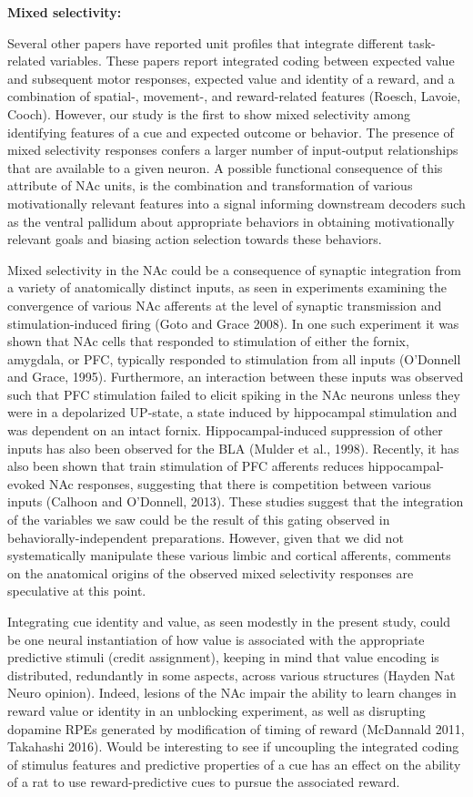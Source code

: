 \documentclass[11pt]{article}
\begin{document}
{\bf Mixed selectivity:}

Several other papers have reported unit profiles that integrate different task-related variables. These papers report integrated coding between expected value and subsequent motor responses, expected value and identity of a reward, and a combination of spatial-, movement-, and reward-related features (Roesch, Lavoie, Cooch). However, our study is the first to show mixed selectivity among identifying features of a cue and expected outcome or behavior. The presence of mixed selectivity responses confers a larger number of input-output relationships that are available to a given neuron. A possible functional consequence of this attribute of NAc units, is the combination and transformation of various motivationally relevant features into a signal informing downstream decoders such as the ventral pallidum about appropriate behaviors in obtaining motivationally relevant goals and biasing action selection towards these behaviors.

Mixed selectivity in the NAc could be a consequence of synaptic integration from a variety of anatomically distinct inputs, as seen in experiments examining the convergence of various NAc afferents at the level of synaptic transmission and stimulation-induced firing (Goto and Grace 2008). In one such experiment it was shown that NAc cells that responded to stimulation of either the fornix, amygdala, or PFC, typically responded to stimulation from all inputs (O’Donnell and Grace, 1995). Furthermore, an interaction between these inputs was observed such that PFC stimulation failed to elicit spiking in the NAc neurons unless they were in a depolarized UP-state, a state induced by hippocampal stimulation and was dependent on an intact fornix. Hippocampal-induced suppression of other inputs has also been observed for the BLA (Mulder et al., 1998). Recently, it has also been shown that train stimulation of PFC afferents reduces hippocampal-evoked NAc responses, suggesting that there is competition between various inputs (Calhoon and O’Donnell, 2013). These studies suggest that the integration of the variables we saw could be the result of this gating observed in behaviorally-independent preparations. However, given that we did not systematically manipulate these various limbic and cortical afferents, comments on the anatomical origins of the observed mixed selectivity responses are speculative at this point.

Integrating cue identity and value, as seen modestly in the present study, could be one neural instantiation of how value is associated with the appropriate predictive stimuli (credit assignment), keeping in mind that value encoding is distributed, redundantly in some aspects, across various structures (Hayden Nat Neuro opinion). Indeed, lesions of the NAc impair the ability to learn changes in reward value or identity in an unblocking experiment, as well as disrupting dopamine RPEs generated by modification of timing of reward (McDannald 2011, Takahashi 2016). Would be interesting to see if uncoupling the integrated coding of stimulus features and predictive properties of a cue has an effect on the ability of a rat to use reward-predictive cues to pursue the associated reward.
\end{document}
